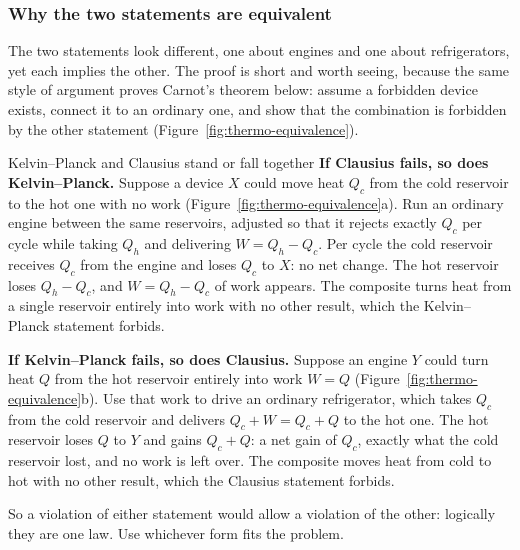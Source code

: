 \subsubsection{Why the two statements are equivalent}

The two statements look different, one about engines and one about refrigerators, yet each implies the
other. The proof is short and worth seeing, because the same style of argument proves Carnot's theorem
below: assume a forbidden device exists, connect it to an ordinary one, and show that the combination is
forbidden by the other statement (Figure~\ref{fig:thermo-equivalence}).

\begin{figure}[htbp]
\centering
{}
\end{figure}

\begin{derivbox}{Kelvin--Planck and Clausius stand or fall together}\label{der:equivalence}
 \textbf{If Clausius fails, so does Kelvin--Planck.} Suppose a device $X$ could move heat $Q_c$
from the cold reservoir to the hot one with no work (Figure~\ref{fig:thermo-equivalence}a). Run an
ordinary engine between the same reservoirs, adjusted so that it rejects exactly $Q_c$ per cycle while
taking $Q_h$ and delivering $W=Q_h-Q_c$. Per cycle the cold reservoir receives $Q_c$ from the engine and
loses $Q_c$ to $X$: no net change. The hot reservoir loses $Q_h-Q_c$, and $W=Q_h-Q_c$ of work appears.
The composite turns heat from a single reservoir entirely into work with no other result, which the
Kelvin--Planck statement forbids.

 \textbf{If Kelvin--Planck fails, so does Clausius.} Suppose an engine $Y$ could turn heat $Q$ from
the hot reservoir entirely into work $W=Q$ (Figure~\ref{fig:thermo-equivalence}b). Use that work to drive
an ordinary refrigerator, which takes $Q_c$ from the cold reservoir and delivers $Q_c+W=Q_c+Q$ to the hot
one. The hot reservoir loses $Q$ to $Y$ and gains $Q_c+Q$: a net gain of $Q_c$, exactly what the cold
reservoir lost, and no work is left over. The composite moves heat from cold to hot with no other result,
which the Clausius statement forbids.

 So a violation of either statement would allow a violation of the other: logically they are one
law. Use whichever form fits the problem.
\end{derivbox}

